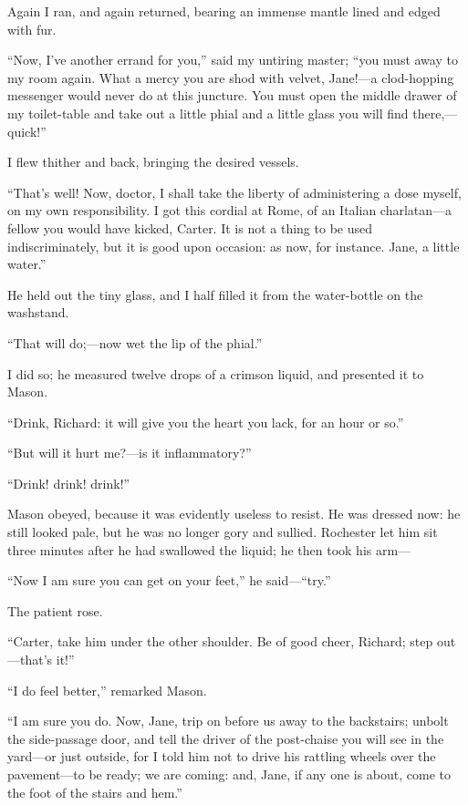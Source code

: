Again I ran, and again returned, bearing an immense mantle lined and
edged with fur.

\enquote{Now, I've another errand for you,} said my untiring master;
\enquote{you must away to my room again. What a mercy you are shod with
velvet, Jane!---a clod-hopping messenger would never do at this
juncture. You must open the middle drawer of my toilet-table and take
out a little phial and a little glass you will find there,---quick!}

I flew thither and back, bringing the desired vessels.

\enquote{That's well! Now, doctor, I shall take the liberty of
administering a dose myself, on my own responsibility. I got this
cordial at Rome, of an Italian charlatan---a fellow you would have
kicked, Carter. It is not a thing to be used indiscriminately, but it
is good upon occasion: as now, for instance. Jane, a little water.}

He held out the tiny glass, and I half filled it from the water-bottle
on the washstand.

\enquote{That will do;---now wet the lip of the phial.}

I did so; he measured twelve drops of a crimson liquid, and presented it
to Mason.

\enquote{Drink, Richard: it will give you the heart you lack, for an
hour or so.}

\enquote{But will it hurt me?---is it inflammatory?}

\enquote{Drink! drink! drink!}

\Mr{} Mason obeyed, because it was evidently useless to resist. He was
dressed now: he still looked pale, but he was no longer gory and
sullied. \Mr{} Rochester let him sit three minutes after he had swallowed
the liquid; he then took his arm---

\enquote{Now I am sure you can get on your feet,} he
said---\enquote{try.}

The patient rose.

\enquote{Carter, take him under the other shoulder. Be of good cheer,
Richard; step out---that's it!}

\enquote{I do feel better,} remarked \Mr{} Mason.

\enquote{I am sure you do. Now, Jane, trip on before us away to the
backstairs; unbolt the side-passage door, and tell the driver of the
post-chaise you will see in the yard---or just outside, for I told him
not to drive his rattling wheels over the pavement---to be ready; we are
coming: and, Jane, if any one is about, come to the foot of the stairs
and hem.}

